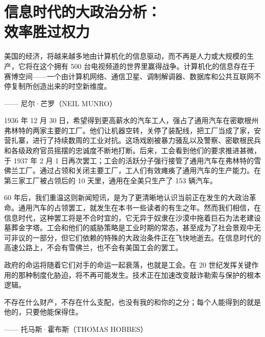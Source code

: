 \chapter[信息时代的大政治分析]{信息时代的大政治分析：\\ 效率胜过权力}

\begin{tcolorbox}
\kaishu 美国的经济，将越来越多地由计算机化的信息驱动，而不再是人力或大规模的生产，它将在这个拥有 500 台电视频道的世界里赢得战争。计算机化的信息存在于赛博空间——一个由计算机网络、通信卫星、调制解调器、数据库和公共互联网不停复制所创造出来的时空新维度。
\begin{flushright}
—— 尼尔·芒罗（NEIL MUNRO）
\end{flushright}
\end{tcolorbox}

1936 年 12 月 30 日，希望得到更高薪水的汽车工人，强占了通用汽车在密歇根州弗林特的两家主要的工厂。他们让机器空转，关停了装配线，把工厂当成了家，安营扎寨，进行了持续数周的工业对抗。这场戏剧被暴力骚乱以及警察、密歇根民兵和各级政府官员摇摆的忠诚度不断地打断。后来，工会看到他们的要求推进甚微，于 1937 年 2 月 1 日再次罢工；工会的活跃分子强行接管了通用汽车在弗林特的雪佛兰工厂。通过占领和关闭主要工厂，工人们有效瘫痪了通用汽车的生产能力。在第三家工厂被占领后的 10 天里，通用在全美只生产了 153 辆汽车。

60 年后，我们重温这则新闻短讯，是为了更清晰地认识当前正在发生的大政治革命。通用汽车的占领罢工，就发生在本书一些读者的有生之年。然而我们相信，在信息时代，这种罢工将是不合时宜的，它无异于奴隶在沙漠中拖着巨石为法老建设墓葬金字塔。工会和他们的威胁策略是工业时期的常态，甚至成为了社会景观中无可非议的一部分，但它们依赖的特殊的大政治条件正在飞快地逝去。在信息时代的高速公路上，不会有雪佛兰，也不会有美国工会的罢工。

政府的命运将随着它们对手的命运一起衰落，也就是工会。在 20 世纪发挥关键作用的那种制度化胁迫，将不再可能发生。技术正在加速改变敲诈勒索与保护的根本逻辑。

\begin{tcolorbox}
\kaishu 不存在什么财产，不存在什么支配，也没有我的和你的之分；每个人能得到的就是他的，只要他能保得住。
\begin{flushright}
—— 托马斯·霍布斯（THOMAS HOBBES）    
\end{flushright} 
\end{tcolorbox}


